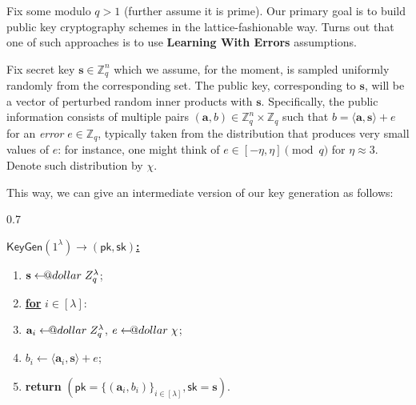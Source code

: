\documentclass{template}
\makeatletter
\newcommand\leftarrowS{\leftarrow\joinrel\smalldollar}
\newcommand{\smalldollar}{\mathrel{\mathpalette\small@dollar\relax}}
\newcommand{\small@dollar}[2]{%
  \vcenter{\hbox{%
    $#1\textnormal{\fontsize{0.7\dimexpr\f@size pt}{0}\selectfont\$}$%
  }}%
}
\makeatother
\begin{document}
Fix some modulo $q>1$ (further assume it is prime). Our primary goal is to build
public key cryptography schemes in the lattice-fashionable way. Turns out that
one of such approaches is to use \textbf{Learning With Errors} assumptions.

Fix secret key $\mathbf{s} \in \mathbb{Z}_q^n$ which we assume, for the moment,
is sampled uniformly randomly from the corresponding set. The public key,
corresponding to $\mathbf{s}$, will be a vector of perturbed random inner
products with $\mathbf{s}$. Specifically, the public information consists of
multiple pairs $(\mathbf{a}, b) \in \mathbb{Z}_q^{n} \times \mathbb{Z}_q$ such
that $b = \langle\mathbf{a},\mathbf{s}\rangle + e$ for an \textit{error} $e \in
\mathbb{Z}_q$, typically taken from the distribution that produces very small
values of $e$: for instance, one might think of $e \in [-\eta,\eta]\pmod{q}$ for
$\eta \approx 3$. Denote such distribution by $\chi$.

This way, we can give an intermediate version of our key generation as follows:

\begin{center}
\begin{varwidth}{0.7\linewidth}
\begin{mdframed}[linecolor=black,
                 linewidth=1.0pt,
                 skipabove=10pt,
                 skipbelow=10pt,
                 leftmargin=0pt,
                 rightmargin=0pt]
\colorbox{purple!10}{\underline{\textbf{$\mathsf{KeyGen}(1^{\lambda}) \to (\mathsf{pk},\mathsf{sk})$:}}}

\begin{enumerate}
    \item $\mathbf{s} \leftarrowS \mathbb{Z}_q^{\lambda}$; 
    \item \underline{\textbf{for}} $i \in [\lambda]$:
    \item \hspace{10px} $\mathbf{a}_i \leftarrowS \mathbb{Z}_q^{\lambda}$, $e \leftarrowS \chi$;
    \item \hspace{10px} $b_i \gets \langle\mathbf{a}_i,\mathbf{s}\rangle + e$;\hspace{5px}{\footnotesize\texttt{\textcolor{gray!70!black}{// Generate random pertubation}}}
    \item \textbf{return} $(\mathsf{pk}=\{(\mathbf{a}_i, b_i)\}_{i \in [\lambda]}, \mathsf{sk}=\mathbf{s})$.
\end{enumerate}
\end{mdframed}
\end{varwidth}
\end{center}
\end{document}
